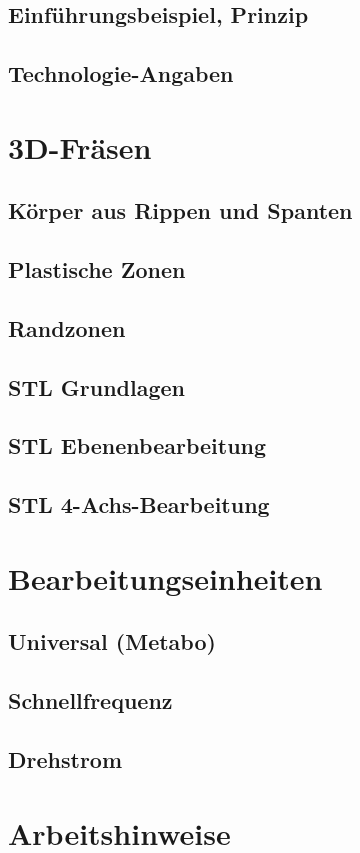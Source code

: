 \documentclass[a4paper]{book}
\begin{document}
		\subsection{Einführungsbeispiel, Prinzip} 
		\subsection{Technologie-Angaben} 
	\section{3D-Fräsen}
		\subsection{Körper aus Rippen und Spanten} 
		\subsection{Plastische Zonen} 
		\subsection{Randzonen} 
		\subsection{STL Grundlagen} 
		\subsection{STL Ebenenbearbeitung} 
		\subsection{STL 4-Achs-Bearbeitung}
	\section{Bearbeitungseinheiten} 
		\subsection{Universal (Metabo)} 
		\subsection{Schnellfrequenz} 
		\subsection{Drehstrom} 	 
	\section{Arbeitshinweise}
\end{document}
